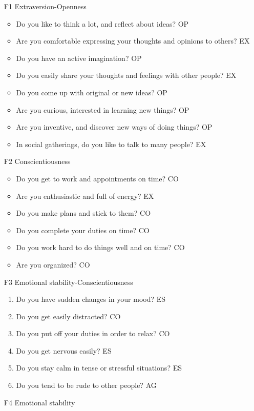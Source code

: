 \documentclass[a4paper, 11pt, onecolumn]{article}
\begin{document}
\begin{itemize}
\item[F1] Extraversion-Openness
	\begin{itemize}
	\item Do you like to think a lot, and reflect about ideas? OP
	\item Are you comfortable expressing your thoughts and opinions to others? EX
	\item Do you have an active imagination? OP
	\item Do you easily share your thoughts and feelings with other people? EX
	\item Do you come up with original or new ideas? OP
	\item Are you curious, interested in learning new things? OP
	\item Are you inventive, and discover new ways of doing things? OP
	\item In social gatherings, do you like to talk to many people? EX
	\end{itemize}
\item[F2] Conscientiousness
	\begin{itemize}
	\item Do you get to work and appointments on time? CO
	\item Are you enthusiastic and full of energy? EX
	\item Do you make plans and stick to them? CO
	\item Do you complete your duties on time? CO
	\item Do you work hard to do things well and on time? CO
	\item Are you organized? CO
	\end{itemize}
\item[F3] Emotional stability-Conscientiousness
	\begin{enumerate}
	\item Do you have sudden changes in your mood? ES
	\item Do you get easily distracted? CO
	\item Do you put off your duties in order to relax? CO
	\item Do you get nervous easily? ES
	\item Do you stay calm in tense or stressful situations? ES
	\item Do you tend to be rude to other people? AG
	\end{enumerate}
\item[F4] Emotional stability
	\begin{enumerate}

\end{enumerate}
\end{itemize}
\end{document}
